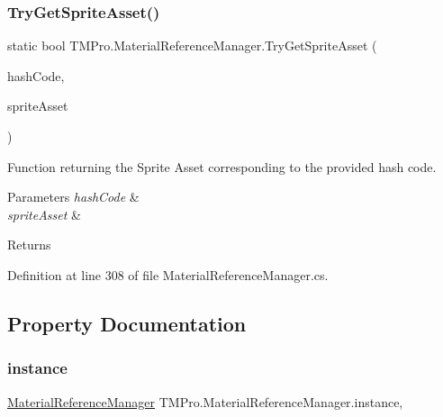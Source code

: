 \subsubsection{\texorpdfstring{TryGetSpriteAsset()}{TryGetSpriteAsset()}}
{\footnotesize\ttfamily static bool T\+M\+Pro.\+Material\+Reference\+Manager.\+Try\+Get\+Sprite\+Asset (\begin{DoxyParamCaption}\item[{int}]{hash\+Code,  }\item[{out \mbox{\hyperlink{class_t_m_pro_1_1_t_m_p___sprite_asset}{T\+M\+P\+\_\+\+Sprite\+Asset}}}]{sprite\+Asset }\end{DoxyParamCaption})\hspace{0.3cm}{\ttfamily [static]}}



Function returning the Sprite Asset corresponding to the provided hash code. 


\begin{DoxyParams}{Parameters}
{\em hash\+Code} & \\
\hline
{\em sprite\+Asset} & \\
\hline
\end{DoxyParams}
\begin{DoxyReturn}{Returns}

\end{DoxyReturn}


Definition at line 308 of file Material\+Reference\+Manager.\+cs.



\subsection{Property Documentation}
\mbox{\label{class_t_m_pro_1_1_material_reference_manager_a51b1daac64638054a8ae2afbae3628f5}} 
\subsubsection{\texorpdfstring{instance}{instance}}
{\footnotesize\ttfamily \mbox{\hyperlink{class_t_m_pro_1_1_material_reference_manager}{Material\+Reference\+Manager}} T\+M\+Pro.\+Material\+Reference\+Manager.\+instance\hspace{0.3cm}{\ttfamily [static]}, {\ttfamily [get]}}



